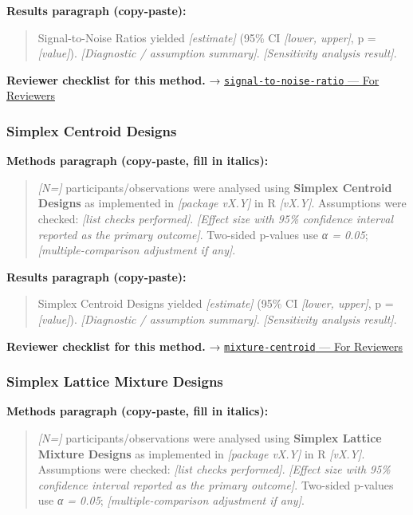 \documentclass[
]{article}
\begin{document}
\textbf{Results paragraph (copy-paste):}

\begin{quote}
Signal-to-Noise Ratios yielded \emph{{[}estimate{]}} (95\% CI
\emph{{[}lower, upper{]}}, p = \emph{{[}value{]}}). \emph{{[}Diagnostic
/ assumption summary{]}}. \emph{{[}Sensitivity analysis result{]}}.
\end{quote}

\textbf{Reviewer checklist for this method.} →
\href{../chapters/16-design/signal-to-noise-ratio.Rmd\#for-reviewers}{\texttt{signal-to-noise-ratio}
--- For Reviewers}

\subsubsection{Simplex Centroid Designs}\label{simplex-centroid-designs}

\textbf{Methods paragraph (copy-paste, fill in italics):}

\begin{quote}
\emph{{[}N={]}} participants/observations were analysed using
\textbf{Simplex Centroid Designs} as implemented in \emph{{[}package
vX.Y{]}} in R \emph{{[}vX.Y{]}}. Assumptions were checked: \emph{{[}list
checks performed{]}}. \emph{{[}Effect size with 95\% confidence interval
reported as the primary outcome{]}}. Two-sided p-values use \emph{α =
0.05}; \emph{{[}multiple-comparison adjustment if any{]}}.
\end{quote}

\textbf{Results paragraph (copy-paste):}

\begin{quote}
Simplex Centroid Designs yielded \emph{{[}estimate{]}} (95\% CI
\emph{{[}lower, upper{]}}, p = \emph{{[}value{]}}). \emph{{[}Diagnostic
/ assumption summary{]}}. \emph{{[}Sensitivity analysis result{]}}.
\end{quote}

\textbf{Reviewer checklist for this method.} →
\href{../chapters/16-design/mixture-centroid.Rmd\#for-reviewers}{\texttt{mixture-centroid}
--- For Reviewers}

\subsubsection{Simplex Lattice Mixture
Designs}\label{simplex-lattice-mixture-designs}

\textbf{Methods paragraph (copy-paste, fill in italics):}

\begin{quote}
\emph{{[}N={]}} participants/observations were analysed using
\textbf{Simplex Lattice Mixture Designs} as implemented in
\emph{{[}package vX.Y{]}} in R \emph{{[}vX.Y{]}}. Assumptions were
checked: \emph{{[}list checks performed{]}}. \emph{{[}Effect size with
95\% confidence interval reported as the primary outcome{]}}. Two-sided
p-values use \emph{α = 0.05}; \emph{{[}multiple-comparison adjustment if
any{]}}.
\end{quote}
\end{document}
